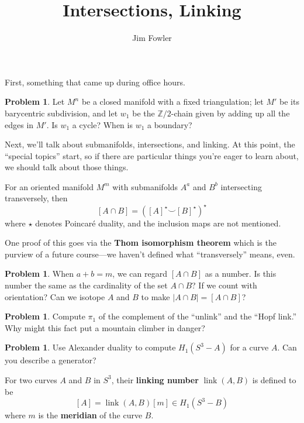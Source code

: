 \documentclass[12pt]{handout}
\title{Intersections, Linking}
\author{Jim Fowler}
\theoremstyle{definition}
\newtheorem{problem}[theorem]{Problem}
\DeclareMathOperator{\link}{link}
\begin{document}
\maketitle

First, something that came up during office hours.

\begin{problem}
  Let $M^n$ be a closed manifold with a fixed triangulation; let $M'$
  be its barycentric subdivision, and let $w_1$ be the $\mathbb{Z}/2$-chain
  given by adding up all the edges in $M'$.  Is $w_1$ a cycle?  When
  is $w_1$ a boundary?
\end{problem}

Next, we'll talk about submanifolds, intersections, and linking.  At
this point, the ``special topics'' start, so if there are particular
things you're eager to learn about, we should talk about those things.

\begin{remark}
For an oriented manifold $M^m$ with submanifolds ${A}^a$ and ${B}^{b}$ intersecting transversely, then
$$
[A \cap B] = \left( [A]^\star \smallsmile [B]^\star \right)^\star
$$
where $\star$ denotes Poincar\'e duality, and the inclusion maps are
not mentioned.
\end{remark}
\noindent
One proof of this goes via the \textbf{Thom isomorphism theorem} which
is the purview of a future course---we haven't defined what
``transversely'' means, even.

\begin{problem}
  When $a + b = m$, we can regard $[A \cap B]$ as a number.  Is this
  number the same as the cardinality of the set $A \cap B$?  If we
  count with orientation?  Can we isotope $A$ and $B$ to make $|A \cap
  B| = [A \cap B]$?
\end{problem}

\begin{problem}
  Compute $\pi_1$ of the complement of the ``unlink'' and the ``Hopf
  link.''  Why might this fact put a mountain climber in danger?
\end{problem}

\begin{problem}
  Use Alexander duality to compute $H_1(S^3 - A)$ for a curve $A$.
  Can you describe a generator?
\end{problem}

\begin{definition}
  For two curves $A$ and $B$ in $S^3$, their \textbf{linking number} $\link(A,B)$ is defined to be
  $$
  [A] = \link(A,B) [m] \in H_1(S^3 - B)
  $$
  where $m$ is the \textbf{meridian} of the curve $B$.
\end{definition}
\end{document}
